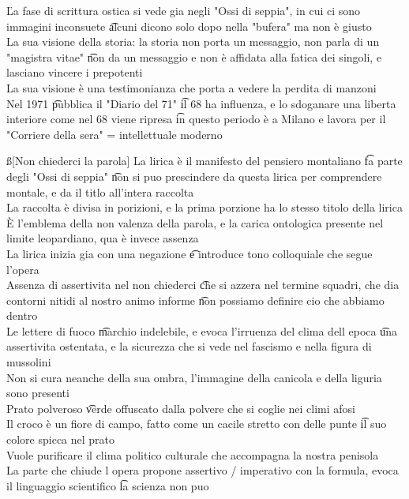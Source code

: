 \documentclass[12pt]{article}
\begin{document}
\v

La fase di scrittura ostica si vede gia negli "Ossi di seppia", in cui ci sono immagini inconsuete \t alcuni dicono solo dopo nella "bufera" ma non è giusto \\
La sua visione della storia: la storia non porta un messaggio, non parla di un "magistra vitae" \t non da un messaggio e non è affidata alla fatica dei singoli, e lasciano vincere i prepotenti \\
La sua visione è una testimonianza che porta a vedere la perdita di manzoni \\
Nel 1971 \t pubblica il "Diario del 71" \t il 68 ha influenza, e lo sdoganare una liberta interiore come nel 68 viene ripresa \t in questo periodo è a Milano e lavora per il "Corriere della sera" = intellettuale moderno

\ss[Non chiederci la parola]
La lirica è il manifesto del pensiero montaliano \t fa parte degli "Ossi di seppia" \t non si puo prescindere da questa lirica per comprendere montale, e da il titlo all'intera raccolta \\
La raccolta è divisa in porizioni, e la prima porzione ha lo stesso titolo della lirica \\
È l'emblema della non valenza della parola, e la carica ontologica presente nel limite leopardiano, qua è invece assenza \\
La lirica inizia gia con una negazione \t e introduce tono colloquiale che segue l'opera \\
Assenza di assertivita nel non chiederci \t che si azzera nel termine squadri, che dia contorni nitidi al nostro animo informe \t non possiamo definire cio che abbiamo dentro \\
Le lettere di fuoco \t marchio indelebile, e evoca l'irruenza del clima dell epoca \t una assertivita ostentata, e la sicurezza che si vede nel fascismo e nella figura di mussolini \\
Non si cura neanche della sua ombra, l'immagine della canicola e della liguria sono presenti \\
Prato polveroso \t verde offuscato dalla polvere che si coglie nei climi afosi \\
Il croco è un fiore di campo, fatto come un cacile stretto con delle punte \t il suo colore spicca nel prato \\
Vuole purificare il clima politico culturale che accompagna la nostra penisola \\
La parte che chiude l opera propone assertivo / imperativo con la formula, evoca il linguaggio scientifico \t la scienza non puo \\
\end{document}
